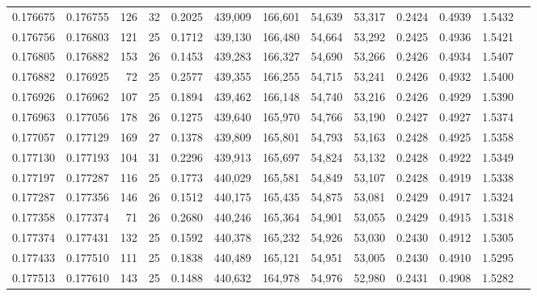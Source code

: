 \begin{tabular}{rrrrrrrrrrrrr}
0.176675 & 0.176755 & 126 &  32 &                                     0.2025 & 439,009 & 166,601 &  54,639 &  53,317 & 0.2424 & 0.4939 & 1.5432 \\
0.176756 & 0.176803 & 121 &  25 &                                     0.1712 & 439,130 & 166,480 &  54,664 &  53,292 & 0.2425 & 0.4936 & 1.5421 \\
0.176805 & 0.176882 & 153 &  26 &                                     0.1453 & 439,283 & 166,327 &  54,690 &  53,266 & 0.2426 & 0.4934 & 1.5407 \\
0.176882 & 0.176925 &  72 &  25 &                                     0.2577 & 439,355 & 166,255 &  54,715 &  53,241 & 0.2426 & 0.4932 & 1.5400 \\
0.176926 & 0.176962 & 107 &  25 &                                     0.1894 & 439,462 & 166,148 &  54,740 &  53,216 & 0.2426 & 0.4929 & 1.5390 \\
0.176963 & 0.177056 & 178 &  26 &                                     0.1275 & 439,640 & 165,970 &  54,766 &  53,190 & 0.2427 & 0.4927 & 1.5374 \\
0.177057 & 0.177129 & 169 &  27 &                                     0.1378 & 439,809 & 165,801 &  54,793 &  53,163 & 0.2428 & 0.4925 & 1.5358 \\
0.177130 & 0.177193 & 104 &  31 &                                     0.2296 & 439,913 & 165,697 &  54,824 &  53,132 & 0.2428 & 0.4922 & 1.5349 \\
0.177197 & 0.177287 & 116 &  25 &                                     0.1773 & 440,029 & 165,581 &  54,849 &  53,107 & 0.2428 & 0.4919 & 1.5338 \\
0.177287 & 0.177356 & 146 &  26 &                                     0.1512 & 440,175 & 165,435 &  54,875 &  53,081 & 0.2429 & 0.4917 & 1.5324 \\
0.177358 & 0.177374 &  71 &  26 &                                     0.2680 & 440,246 & 165,364 &  54,901 &  53,055 & 0.2429 & 0.4915 & 1.5318 \\
0.177374 & 0.177431 & 132 &  25 &                                     0.1592 & 440,378 & 165,232 &  54,926 &  53,030 & 0.2430 & 0.4912 & 1.5305 \\
0.177433 & 0.177510 & 111 &  25 &                                     0.1838 & 440,489 & 165,121 &  54,951 &  53,005 & 0.2430 & 0.4910 & 1.5295 \\
0.177513 & 0.177610 & 143 &  25 &                                     0.1488 & 440,632 & 164,978 &  54,976 &  52,980 & 0.2431 & 0.4908 & 1.5282 \\

\end{tabular}
